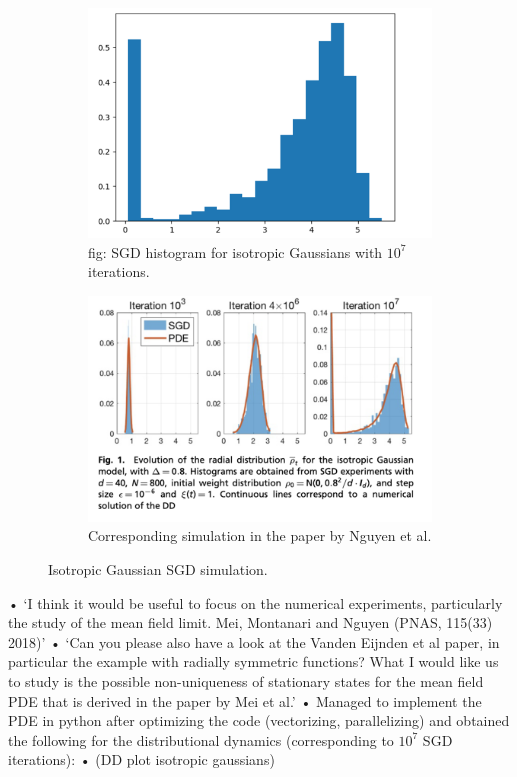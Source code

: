 \documentclass{article}
\begin{document}
\begin{figure}[H]
\begin{subfigure}{0.5\textwidth}
  \centering
  \includegraphics[width=0.8\linewidth]{ images/Nguyen2018-SGD-1.png}
  \caption{fig: SGD histogram for isotropic Gaussians with $ 10^{7}$ iterations.}
  \label{fig: SGD histogram isotropic Gaussians}
\end{subfigure}%
\begin{subfigure}{0.5\textwidth}
  \centering
  \includegraphics[width=0.8\linewidth]{images/Nguyen2018-paper-numerical-validation-iso-gauss.png}
  \caption{Corresponding simulation in the paper by Nguyen et al.}
  \label{fig: Nguyen 2018 isotropic Gaussian simulation}
\end{subfigure}
\caption{Isotropic Gaussian SGD simulation.}
\label{fig:  isotropic gaussians SGD}
\end{figure}

•	‘I think it would be useful to focus on the numerical experiments, particularly the study of the mean field limit. Mei, Montanari and Nguyen (PNAS, 115(33) 2018)’
•	 ‘Can you please also have a look at the Vanden Eijnden et al paper, in particular the example with radially symmetric functions? What I would like us to study is the possible non-uniqueness of stationary states for the mean field PDE that is derived in the paper by Mei et al.’
•	Managed to implement the PDE in python after optimizing the code (vectorizing, parallelizing) and obtained the following for the distributional dynamics (corresponding to $10^7$ SGD iterations):
•	(DD plot isotropic gaussians)
\end{document}
